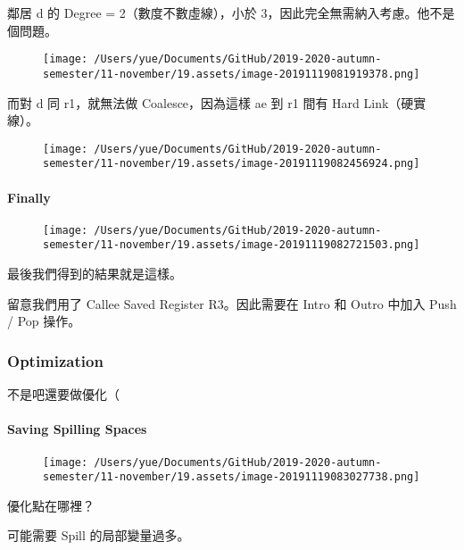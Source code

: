 \documentclass[
]{article}
\begin{document}
鄰居 d 的 Degree = 2（數度不數虛線），小於
3，因此完全無需納入考慮。他不是個問題。

\begin{figure}
\centering
\texttt{[image: /Users/yue/Documents/GitHub/2019-2020-autumn-semester/11-november/19.assets/image-20191119081919378.png]}
\caption{}
\end{figure}

而對 d 同 r1，就無法做 Coalesce，因為這樣 ae 到 r1 間有 Hard
Link（硬實線）。

\begin{figure}
\centering
\texttt{[image: /Users/yue/Documents/GitHub/2019-2020-autumn-semester/11-november/19.assets/image-20191119082456924.png]}
\caption{}
\end{figure}

\hypertarget{header-n25}{%
\paragraph{Finally}\label{header-n25}}

\begin{figure}
\centering
\texttt{[image: /Users/yue/Documents/GitHub/2019-2020-autumn-semester/11-november/19.assets/image-20191119082721503.png]}
\caption{}
\end{figure}

最後我們得到的結果就是這樣。

留意我們用了 Callee Saved Register R3。因此需要在 Intro 和 Outro 中加入
Push / Pop 操作。

\hypertarget{header-n29}{%
\subsubsection{Optimization}\label{header-n29}}

不是吧還要做優化（

\hypertarget{header-n31}{%
\paragraph{Saving Spilling Spaces}\label{header-n31}}

\begin{figure}
\centering
\texttt{[image: /Users/yue/Documents/GitHub/2019-2020-autumn-semester/11-november/19.assets/image-20191119083027738.png]}
\caption{}
\end{figure}

優化點在哪裡？

可能需要 Spill 的局部變量過多。
\end{document}
